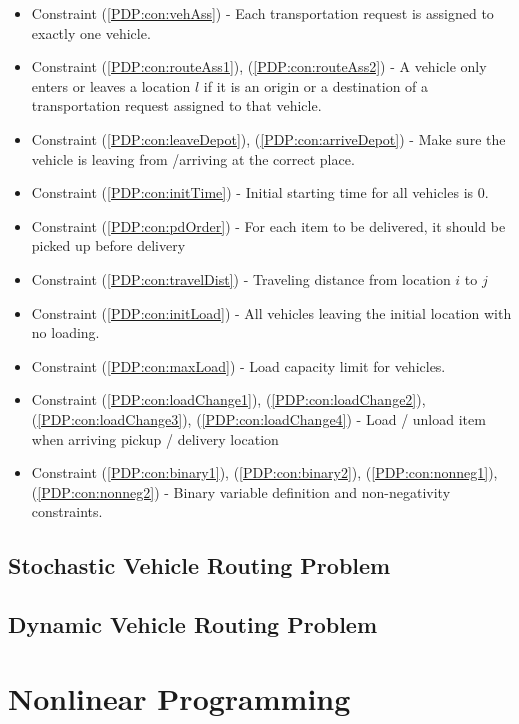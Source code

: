 				\begin{itemize}
					\item Constraint (\ref{PDP:con:vehAss}) - Each transportation request is assigned to exactly one vehicle.
					\item Constraint (\ref{PDP:con:routeAss1}), (\ref{PDP:con:routeAss2}) - A vehicle only enters or leaves a location $l$ if it is an origin or a destination of a transportation request assigned to that vehicle.
					\item Constraint (\ref{PDP:con:leaveDepot}), (\ref{PDP:con:arriveDepot}) - Make sure the vehicle is leaving from /arriving at the correct place.
					\item Constraint (\ref{PDP:con:initTime}) - Initial starting time for all vehicles is 0.
					\item Constraint (\ref{PDP:con:pdOrder}) - For each item to be delivered, it should be picked up before delivery
					\item Constraint (\ref{PDP:con:travelDist}) - Traveling distance from location $i$ to $j$
					\item Constraint (\ref{PDP:con:initLoad}) - All vehicles leaving the initial location with no loading.
					\item Constraint (\ref{PDP:con:maxLoad}) - Load capacity limit for vehicles.
					\item Constraint (\ref{PDP:con:loadChange1}), (\ref{PDP:con:loadChange2}), (\ref{PDP:con:loadChange3}), (\ref{PDP:con:loadChange4}) - Load / unload item when arriving pickup / delivery location
					\item Constraint (\ref{PDP:con:binary1}), (\ref{PDP:con:binary2}), (\ref{PDP:con:nonneg1}), (\ref{PDP:con:nonneg2}) - Binary variable definition and non-negativity constraints.
				\end{itemize}


		\chapter{Stochastic Vehicle Routing Problem}

		\chapter{Dynamic Vehicle Routing Problem}

	\part{Nonlinear Programming}\label{Nonlinear}
